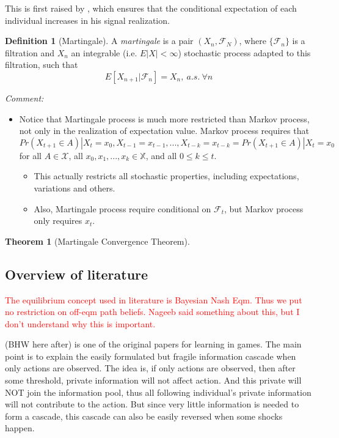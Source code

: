 \documentclass{book}
\theoremstyle{plain}
\newtheorem{thm}{Theorem}[section] %
\theoremstyle{definition}
\newtheorem{defn}{Definition}[section] %
\newcommand{\F}{\mathcal{F}}
\begin{document}
This is first raised by \cite{Milgrom:1981dv}, which ensures that the conditional expectation of each individual increases in his signal realization.

\begin{defn}[Martingale]
A \textit{martingale} is a pair $(X_n,\F_N)$, where $\{\F_n\}$ is a filtration and $X_n$ an integrable (i.e. $E|X|<\infty$) stochastic process adapted to this filtration, such that 
\[E[X_{n+1}|\mathcal{F}_n]=X_n,\ a.s. \ \forall n\]
\end{defn}

\noindent
\textit{Comment:}
\begin{itemize}
	\setlength{\itemsep}{0pt}
	\item Notice that Martingale process is much more restricted than Markov process, not only in the realization of expectation value. Markov process requires that 
	\[Pr(X_{t+1}\in A)|X_t=x_0,X_{t-1}=x_{t-1},...,X_{t-k}=x_{t-k}
	=Pr(X_{t+1}\in A)|X_t=x_0\]
	for all $A \in \mathcal{X}$, all $x_0,x_1,...,x_k \in \mathbb{X}$, and all $0\leq k\leq t$. 
	\begin{itemize}
		\item This actually restricts all stochastic properties, including expectations, variations and others.
		\item Also, Martingale process require conditional on $\F_t$, but Markov process only requires $x_t$.
	\end{itemize}
\end{itemize}



\begin{thm}[Martingale Convergence Theorem]

\end{thm}




\subsection{Overview of literature} %
\label{sub:overview_of_literature}


\textcolor{red}{The equilibrium concept used in literature is Bayesian Nash Eqm. Thus we put no restriction on off-eqm path beliefs. Nageeb said something about this, but I don't understand why this is important.}

\cite{Bikhchandani:1992fs} (BHW here after) is one of the original papers for learning in games. The main point is to explain the easily formulated but fragile information cascade when only actions are observed. The idea is, if only actions are observed, then after some threshold, private information will not affect action. And this private will NOT join the information pool, thus all following individual's private information will not contribute to the action. But since very little information is needed to form a cascade, this cascade can also be easily reversed when some shocks happen.
\end{document}
